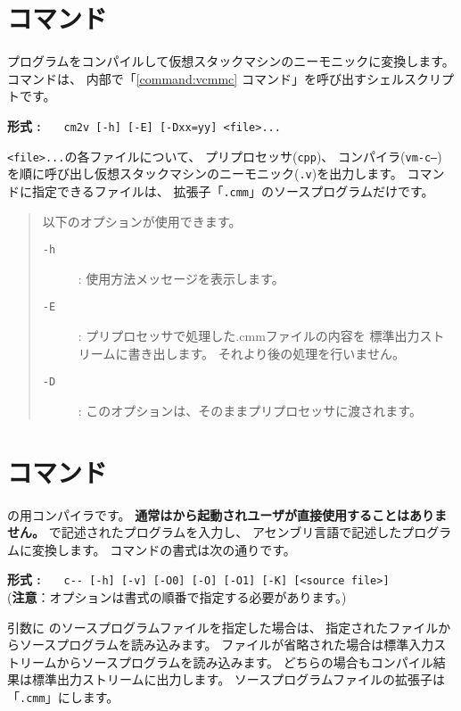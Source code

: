 \section{{\cmv}コマンド}

{\cmm}プログラムをコンパイルして仮想スタックマシンのニーモニックに変換します。
{\cmv}コマンドは、
内部で「\ref{command:vcmmc} {\vcmmc}コマンド」を呼び出すシェルスクリプトです。

\begin{flushleft}
{\bf 形式 : }~~~\verb/cm2v [-h] [-E] [-Dxx=yy] <file>.../
\end{flushleft}

{\tt <file>...}の各ファイルについて、
プリプロセッサ({\tt cpp})、
コンパイラ({\tt vm-c--})
を順に呼び出し仮想スタックマシンのニーモニック({\tt .v})を出力します。
{\cmv}コマンドに指定できるファイルは、
拡張子「{\tt .cmm}」の{\cmml}ソースプログラムだけです。

\begin{quote}
\hspace{-1em}以下のオプションが使用できます。

\begin{description}
\item[{\tt -h}] : 使用方法メッセージを表示します。
\item[{\tt -E}] : プリプロセッサで処理した{.cmm}ファイルの内容を
標準出力ストリームに書き出します。
それより後の処理を行いません。
\item[{\tt -D}] : このオプションは、そのままプリプロセッサに渡されます。
\end{description}
\end{quote}

\section{{\cmmc}コマンド}
\label{command:cmmc}

{\cmml}の{\tac}用コンパイラです。
{\bf 通常は{\cme}から起動されユーザが直接使用することはありません。}
\cmml で記述されたプログラムを入力し、
\tac アセンブリ言語で記述したプログラムに変換します。
\cmmc コマンドの書式は次の通りです。

\begin{flushleft}
{\bf 形式 : }~~~\verb/c-- [-h] [-v] [-O0] [-O] [-O1] [-K] [<source file>]/\\
({\bf 注意}：オプションは書式の順番で指定する必要があります。)
\end{flushleft}

引数に \cmml のソースプログラムファイルを指定した場合は、
指定されたファイルからソースプログラムを読み込みます。
ファイルが省略された場合は標準入力ストリームからソースプログラムを読み込みます。
どちらの場合もコンパイル結果は標準出力ストリームに出力します。
ソースプログラムファイルの拡張子は「\verb/.cmm/」にします。

